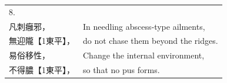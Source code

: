 \begin{longtable}{p{} p{}}

\multicolumn{2}{l}{8.}\\

凡刺癰邪， &
In needling abscess‐type ailments,\\

無迎隴【1東平】， &
do not chase them beyond the ridges.\\

易俗移性， &
Change the internal environment,\\

不得膿【1東平】， &
so that no pus forms.\\







\end{longtable}



